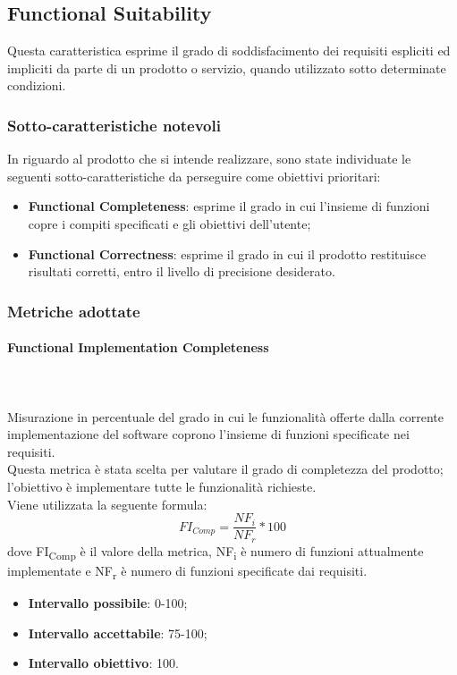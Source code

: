 \subsection{Functional Suitability}
Questa caratteristica esprime il grado di soddisfacimento dei requisiti espliciti ed impliciti da parte di un prodotto o servizio, quando utilizzato sotto determinate condizioni.
\subsubsection{Sotto-caratteristiche notevoli}
In riguardo al prodotto che si intende realizzare, sono state individuate le seguenti sotto-caratteristiche da perseguire come obiettivi prioritari: 
\begin{itemize}
	\item{\textbf{Functional Completeness}}: esprime il grado in cui l'insieme di funzioni copre i compiti specificati e gli obiettivi dell'utente;
	\item{\textbf{Functional Correctness}}: esprime il grado in cui il prodotto restituisce risultati corretti, entro il livello di precisione desiderato.
\end{itemize}
\subsubsection{Metriche adottate} 
\paragraph{Functional Implementation Completeness} ~\\ ~\\
Misurazione in percentuale del grado in cui le funzionalità offerte dalla corrente implementazione del software coprono l'insieme di funzioni specificate nei requisiti.\\
Questa metrica è stata scelta per valutare il grado di completezza del prodotto; l'obiettivo è implementare tutte le funzionalità richieste.\\
Viene utilizzata la seguente formula:
$$FI_{Comp}=\frac{NF_i}{NF_r}*100$$
dove FI\textsubscript{Comp} è il valore della metrica, NF\textsubscript{i} è numero di funzioni attualmente implementate e NF\textsubscript{r} è numero di funzioni specificate dai requisiti.
\begin{itemize}
	\item{\textbf{Intervallo possibile}: 0-100;}
	\item{\textbf{Intervallo accettabile}: 75-100;}
	\item{\textbf{Intervallo obiettivo}: 100.}
\end{itemize}

